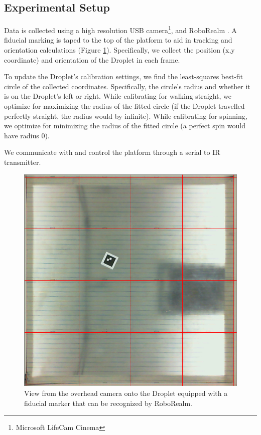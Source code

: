 \documentclass[letterpaper, 10pt, conference]{ieeeconf}
\begin{document}
\subsection{Experimental Setup}
Data is collected using a high resolution USB camera\footnote{Microsoft LifeCam Cinema}, and RoboRealm \cite{RoboRealm}. A fiducial marking is taped to the top of the platform to aid in tracking and orientation calculations (Figure \ref{fig:expsetup}). Specifically, we collect the position (x,y coordinate) and orientation of the Droplet in each frame.

To update the Droplet's calibration settings, we find the least-squares best-fit circle of the collected coordinates. Specifically, the circle's radius and whether it is on the Droplet's left or right. While calibrating for walking straight, we optimize for maximizing the radius of the fitted circle (if the Droplet travelled perfectly straight, the radius would by infinite). While calibrating for spinning, we optimize for minimizing the radius of the fitted circle (a perfect spin would have radius 0).

We communicate with and control the platform through a serial to IR transmitter. 

\begin{figure}[!htb]
\includegraphics[width=\linewidth]{images/cameraView}
\caption{View from the overhead camera onto the Droplet equipped with a fiducial marker that can be recognized by RoboRealm.\label{fig:expsetup}} 
\end{figure}
\end{document}
